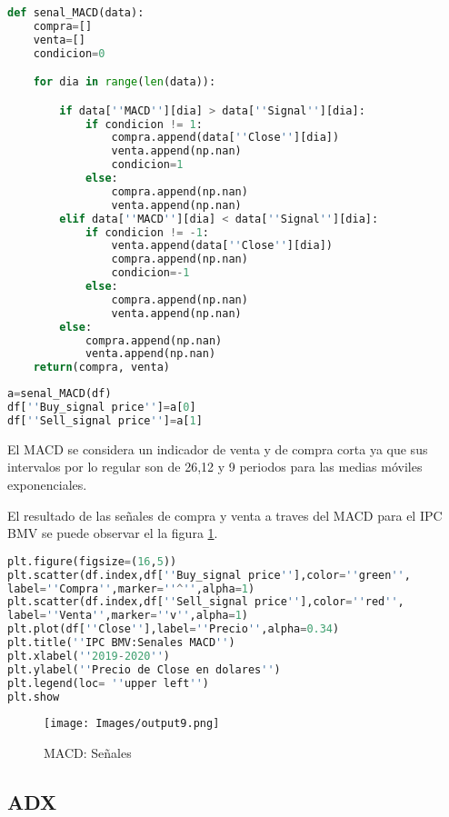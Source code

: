 \documentclass[letterpaper,12pt,oneside]{book}
\begin{document}
\begin{lstlisting}[language=Python]
def senal_MACD(data):
    compra=[]
    venta=[]
    condicion=0

    for dia in range(len(data)):

        if data[''MACD''][dia] > data[''Signal''][dia]:
            if condicion != 1:
                compra.append(data[''Close''][dia])
                venta.append(np.nan)
                condicion=1
            else:
                compra.append(np.nan)
                venta.append(np.nan)
        elif data[''MACD''][dia] < data[''Signal''][dia]:
            if condicion != -1:
                venta.append(data[''Close''][dia])
                compra.append(np.nan)
                condicion=-1
            else:
                compra.append(np.nan)
                venta.append(np.nan)
        else:
            compra.append(np.nan)
            venta.append(np.nan)
    return(compra, venta)

\end{lstlisting}
\begin{lstlisting}[language=Python]
a=senal_MACD(df)
df[''Buy_signal price'']=a[0]
df[''Sell_signal price'']=a[1]
\end{lstlisting}

El MACD se considera un indicador de venta y de compra corta ya que sus intervalos por lo regular son de 26,12 y 9 periodos para las medias móviles exponenciales.
\vspace{0.5cm}

El resultado de las señales de compra y venta a traves del MACD para el IPC BMV se puede observar el la figura \ref{fig:m10}.


\begin{lstlisting}[language=Python]
plt.figure(figsize=(16,5))
plt.scatter(df.index,df[''Buy_signal price''],color=''green'',
label=''Compra'',marker=''^'',alpha=1)
plt.scatter(df.index,df[''Sell_signal price''],color=''red'',
label=''Venta'',marker=''v'',alpha=1)
plt.plot(df[''Close''],label=''Precio'',alpha=0.34)
plt.title(''IPC BMV:Senales MACD'')
plt.xlabel(''2019-2020'')
plt.ylabel(''Precio de Close en dolares'')
plt.legend(loc= ''upper left'')
plt.show
\end{lstlisting}


\begin{figure}[ht]
	\centering
	\texttt{[image: Images/output9.png]}
	\caption{MACD: Señales}
	\label{fig:m10}
\end{figure}

\subsection{ADX}
\end{document}
